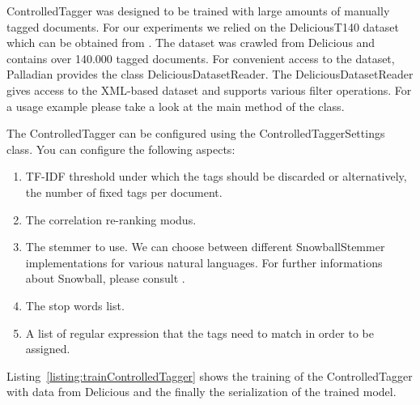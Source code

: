 
ControlledTagger was designed to be trained with large amounts of manually tagged documents. For our experiments we relied on the DeliciousT140 dataset which can be obtained from \cite{deliciousT140}. The dataset was crawled from Delicious and contains over 140.000 tagged documents. For convenient access to the dataset, Palladian provides the class DeliciousDatasetReader. The DeliciousDatasetReader gives access to the XML-based dataset and supports various filter operations. For a usage example please take a look at the main method of the class.

The ControlledTagger can be configured using the ControlledTaggerSettings class. You can configure the following aspects:

\begin{enumerate}
\item TF-IDF threshold under which the tags should be discarded or alternatively, the number of fixed tags per document.
\item The correlation re-ranking modus.
\item The stemmer to use. We can choose between different SnowballStemmer implementations for various natural languages. For further informations about Snowball, please consult \cite{snowball}.
\item The stop words list.
\item A list of regular expression that the tags need to match in order to be assigned.
\end{enumerate}

Listing~\ref{listing:trainControlledTagger} shows the training of the ControlledTagger with data from Delicious and the finally the serialization of the trained model.

